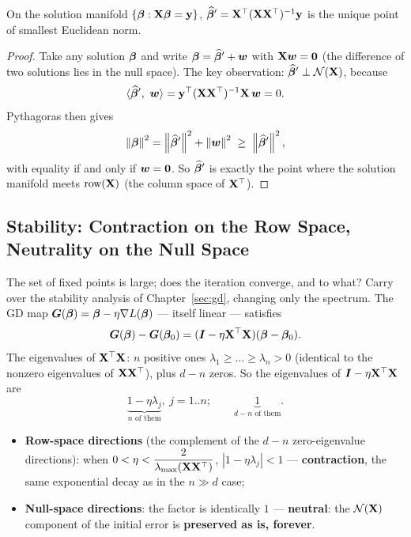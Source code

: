 \begin{theorem}\label{thm:minnorm}
On the solution manifold $\{ \bm{\beta} : \mathbf{X} \bm{\beta} = \mathbf{y} \}$, $\widehat{\bm{\beta}}' = \mathbf{X}^\top(\mathbf{X}\mathbf{X}^\top)^{-1}\mathbf{y}$ is the unique point of smallest Euclidean norm.
\end{theorem}
\begin{proof}
Take any solution $\bm{\beta}$ and write $\bm{\beta} = \widehat{\bm{\beta}}' + \bm{w}$ with $\mathbf{X}\bm{w} = \mathbf{0}$ (the difference of two solutions lies in the null space). The key observation: $\widehat{\bm{\beta}}' \perp \mathcal{N}(\mathbf{X})$, because
\[
  \langle \widehat{\bm{\beta}}',\ \bm{w} \rangle = \mathbf{y}^\top (\mathbf{X}\mathbf{X}^\top)^{-1} \mathbf{X}\, \bm{w} = 0 .
\]
Pythagoras then gives
\[
  \left\lVert \bm{\beta} \right\rVert^2 = \left\lVert \widehat{\bm{\beta}}' \right\rVert^2 + \left\lVert \bm{w} \right\rVert^2 \;\ge\; \left\lVert \widehat{\bm{\beta}}' \right\rVert^2,
\]
with equality if and only if $\bm{w} = \mathbf{0}$. So $\widehat{\bm{\beta}}'$ is exactly the point where the solution manifold meets $\mathrm{row}(\mathbf{X})$ (the column space of $\mathbf{X}^\top$).
\end{proof}

\subsection{Stability: Contraction on the Row Space, Neutrality on the Null Space}\label{sec:stability}

The set of fixed points is large; does the iteration converge, and to what? Carry over the stability analysis of Chapter~\ref{sec:gd}, changing only the spectrum. The GD map $\bm{G}(\bm{\beta}) = \bm{\beta} - \eta \nabla L(\bm{\beta})$ — itself linear — satisfies
\[
  \bm{G}(\bm{\beta}) - \bm{G}(\bm{\beta}_0) = (\bm{I} - \eta \mathbf{X}^\top \mathbf{X})(\bm{\beta} - \bm{\beta}_0).
\]
The eigenvalues of $\mathbf{X}^\top\mathbf{X}$: $n$ positive ones $\lambda_1 \ge \dots \ge \lambda_n > 0$ (identical to the nonzero eigenvalues of $\mathbf{X}\mathbf{X}^\top$), plus $d - n$ zeros. So the eigenvalues of $\bm{I} - \eta\mathbf{X}^\top\mathbf{X}$ are
\[
  \underbrace{1 - \eta \lambda_j}_{n \text{ of them}},\ j = 1..n;
  \qquad
  \underbrace{1}_{d - n \text{ of them}}.
\]
\begin{itemize}
  \item \textbf{Row-space directions} (the complement of the $d-n$ zero-eigenvalue directions): when $0 < \eta < \dfrac{2}{\lambda_{\max}(\mathbf{X}\mathbf{X}^\top)}$, $|1 - \eta\lambda_j| < 1$ — \textbf{contraction}, the same exponential decay as in the $n \gg d$ case;
  \item \textbf{Null-space directions}: the factor is identically $1$ — \textbf{neutral}: the $\mathcal{N}(\mathbf{X})$ component of the initial error is \textbf{preserved as is, forever}.
\end{itemize}

